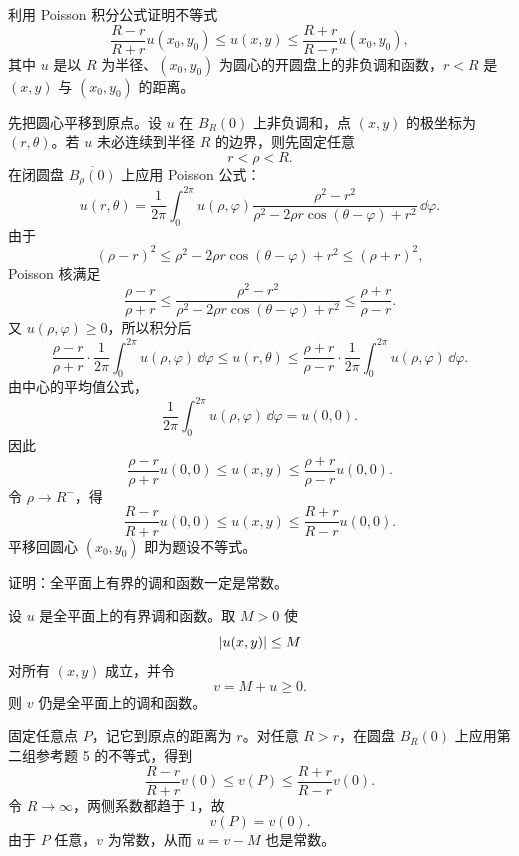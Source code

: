 \begin{xreferenceproblem}[5]
利用 Poisson 积分公式证明不等式
\[
  \frac{R-r}{R+r}u(x_0,y_0)\le u(x,y)\le\frac{R+r}{R-r}u(x_0,y_0),
\]
其中 $u$ 是以 $R$ 为半径、$(x_0,y_0)$ 为圆心的开圆盘上的非负调和函数，$r<R$ 是 $(x,y)$ 与 $(x_0,y_0)$ 的距离。
\end{xreferenceproblem}
\begin{xsolution}
先把圆心平移到原点。设 $u$ 在 $B_R(0)$ 上非负调和，点 $(x,y)$ 的极坐标为 $(r,\theta)$。若 $u$ 未必连续到半径 $R$ 的边界，则先固定任意
\[
  r<\rho<R.
\]
在闭圆盘 $\overline{B_\rho(0)}$ 上应用 Poisson 公式：
\[
  u(r,\theta)=\frac1{2\pi}\int_0^{2\pi}
  u(\rho,\varphi)
  \frac{\rho^2-r^2}{\rho^2-2\rho r\cos(\theta-\varphi)+r^2}\,\dd\varphi.
\]
由于
\[
  (\rho-r)^2
  \le \rho^2-2\rho r\cos(\theta-\varphi)+r^2
  \le(\rho+r)^2,
\]
Poisson 核满足
\[
  \frac{\rho-r}{\rho+r}
  \le
  \frac{\rho^2-r^2}{\rho^2-2\rho r\cos(\theta-\varphi)+r^2}
  \le
  \frac{\rho+r}{\rho-r}.
\]
又 $u(\rho,\varphi)\ge0$，所以积分后
\[
  \frac{\rho-r}{\rho+r}\cdot
  \frac1{2\pi}\int_0^{2\pi}u(\rho,\varphi)\,\dd\varphi
  \le u(r,\theta)
  \le
  \frac{\rho+r}{\rho-r}\cdot
  \frac1{2\pi}\int_0^{2\pi}u(\rho,\varphi)\,\dd\varphi.
\]
由中心的平均值公式，
\[
  \frac1{2\pi}\int_0^{2\pi}u(\rho,\varphi)\,\dd\varphi=u(0,0).
\]
因此
\[
  \frac{\rho-r}{\rho+r}u(0,0)
  \le u(x,y)\le
  \frac{\rho+r}{\rho-r}u(0,0).
\]
令 $\rho\to R^-$，得
\[
  \frac{R-r}{R+r}u(0,0)
  \le u(x,y)\le
  \frac{R+r}{R-r}u(0,0).
\]
平移回圆心 $(x_0,y_0)$ 即为题设不等式。
\end{xsolution}


\begin{xreferenceproblem}[6]
证明：全平面上有界的调和函数一定是常数。
\end{xreferenceproblem}
\begin{xsolution}
设 $u$ 是全平面上的有界调和函数。取 $M>0$ 使
\[
  \lvert u(x,y)\rvert\le M
\]
对所有 $(x,y)$ 成立，并令
\[
  v=M+u\ge0.
\]
则 $v$ 仍是全平面上的调和函数。

固定任意点 $P$，记它到原点的距离为 $r$。对任意 $R>r$，在圆盘 $B_R(0)$ 上应用第二组参考题 5 的不等式，得到
\[
  \frac{R-r}{R+r}v(0)
  \le v(P)\le
  \frac{R+r}{R-r}v(0).
\]
令 $R\to\infty$，两侧系数都趋于 $1$，故
\[
  v(P)=v(0).
\]
由于 $P$ 任意，$v$ 为常数，从而 $u=v-M$ 也是常数。
\end{xsolution}


